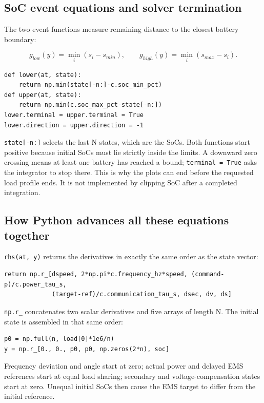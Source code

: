 \documentclass[11pt,a4paper]{article}
\begin{document}
\subsection{SoC event equations and solver termination}

The two event functions measure remaining distance to the closest battery boundary:

\[
g_{low}(y)=\min_i(s_i-s_{min}),\qquad
g_{high}(y)=\min_i(s_{max}-s_i).
\]

\begin{lstlisting}
def lower(at, state):
    return np.min(state[-n:]-c.soc_min_pct)
def upper(at, state):
    return np.min(c.soc_max_pct-state[-n:])
lower.terminal = upper.terminal = True
lower.direction = upper.direction = -1
\end{lstlisting}

\texttt{state[-n:]} selects the last N states, which are the SoCs. Both functions start positive because initial SoCs must lie strictly inside the limits. A downward zero crossing means at least one battery has reached a bound; \texttt{terminal = True} asks the integrator to stop there. This is why the plots can end before the requested load profile ends. It is not implemented by clipping SoC after a completed integration.

\subsection{How Python advances all these equations together}

\texttt{rhs(at, y)} returns the derivatives in exactly the same order as the state vector:

\begin{lstlisting}
return np.r_[dspeed, 2*np.pi*c.frequency_hz*speed, (command-p)/c.power_tau_s,
             (target-ref)/c.communication_tau_s, dsec, dv, ds]
\end{lstlisting}

\texttt{np.r\_} concatenates two scalar derivatives and five arrays of length N. The initial state is assembled in that same order:

\begin{lstlisting}
p0 = np.full(n, load[0]*1e6/n)
y = np.r_[0., 0., p0, p0, np.zeros(2*n), soc]
\end{lstlisting}

Frequency deviation and angle start at zero; actual power and delayed EMS references start at equal load sharing; secondary and voltage-compensation states start at zero. Unequal initial SoCs then cause the EMS target to differ from the initial reference.
\end{document}
